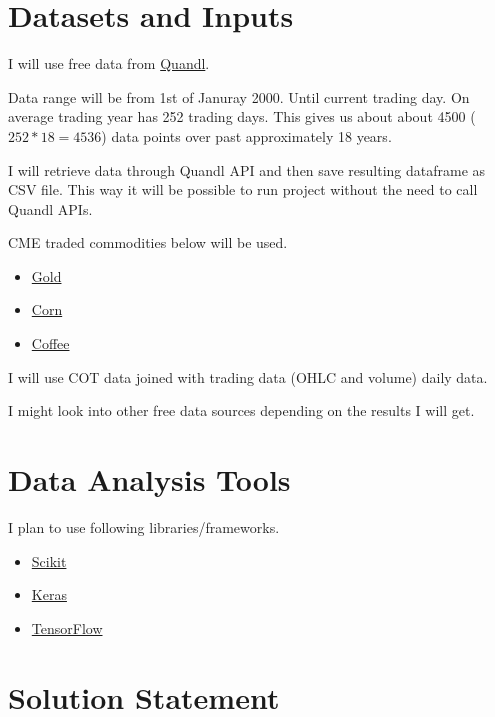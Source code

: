 \documentclass[final,2p]{elsarticle}
\begin{document}
\section{Datasets and Inputs}

I will use free data from \href{https://www.quandl.com/}{Quandl}. 

Data range will be from 1st of Januray 2000. Until current trading day. On average trading year has 252 trading days. This gives us about about 4500 ($252*18 = 4536$) data points over past approximately 18 years.

I will retrieve data through Quandl API and then save resulting dataframe as CSV file.
This way it will be possible to run project without the need to call Quandl APIs.

CME traded commodities below will be used.

\begin{itemize}
\item \href{https://www.cmegroup.com/trading/metals/precious/gold.html}{Gold}
\item \href{https://www.cmegroup.com/trading/agricultural/grain-and-oilseed/corn.html}{Corn}
\item \href{https://www.cmegroup.com/trading/agricultural/softs/coffee.html}{Coffee}
\end{itemize}

I will use COT data joined with trading data (OHLC and volume) daily data.

I might look into other free data sources depending on the results I will get.

\section{Data Analysis Tools}

I plan to use following libraries/frameworks.

\begin{itemize}
    \item \href{https://scikit-learn.org/}{Scikit}
    \item \href{https://keras.io/}{Keras}
    \item \href{https://www.tensorflow.org/}{TensorFlow}
\end{itemize}

\section{Solution Statement}
\end{document}
